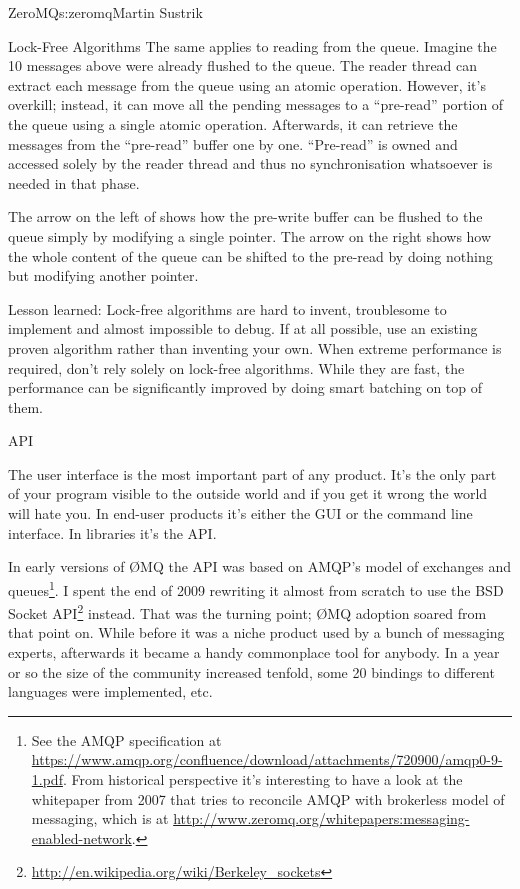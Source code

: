 \begin{aosachapter}{ZeroMQ}{s:zeromq}{Martin Sustrik}
\begin{aosasect1}{Lock-Free Algorithms}
The same applies to reading from the queue. Imagine the 10 messages above
were already flushed to the queue. The reader thread can extract each
message from the queue using an atomic operation. However, it's 
overkill; instead, it can move all the pending messages to a
``pre-read'' portion of the queue using a single atomic
operation. Afterwards, it can retrieve the messages from the ``pre-read''
buffer one by one. ``Pre-read'' is owned and accessed solely by the
reader thread and thus no synchronisation whatsoever is needed in that
phase.


The arrow on the left of  shows how
the pre-write buffer can be flushed to the queue simply by modifying a
single pointer. The arrow on the right shows how the whole content of the
queue can be shifted to the pre-read by doing nothing but modifying
another pointer.

Lesson learned: Lock-free algorithms are hard to invent, troublesome
to implement and almost impossible to debug. If at all possible, use
an existing proven algorithm rather than inventing your own. When
extreme performance is required, don't rely solely on lock-free
algorithms. While they are fast, the performance can be significantly
improved by doing smart batching on top of them.

\end{aosasect1}

\begin{aosasect1}{API}

The user interface is the most important part of any product. It's the
only part of your program visible to the outside world and if you get
it wrong the world will hate you. In end-user products it's either the GUI
or the command line interface. In libraries it's the API.

In early versions of {\O}MQ the API was based on AMQP's model of
exchanges and queues\footnote{See the AMQP specification at
  \url{https://www.amqp.org/confluence/download/attachments/720900/amqp0-9-1.pdf}. From
  historical perspective it's interesting to have a look at the
  whitepaper from 2007 that tries to reconcile AMQP with brokerless
  model of messaging, which is at
  \url{http://www.zeromq.org/whitepapers:messaging-enabled-network}.}. I
spent the end of 2009 rewriting it almost from scratch to use the BSD
Socket
API\footnote{\url{http://en.wikipedia.org/wiki/Berkeley_sockets}}
instead. That was the turning point; {\O}MQ adoption soared from that
point on. While before it was a niche product used by a bunch of
messaging experts, afterwards it became a handy commonplace tool for
anybody. In a year or so the size of the community increased tenfold,
some 20 bindings to different languages were implemented, etc.


\end{aosasect1}
\end{aosachapter}
